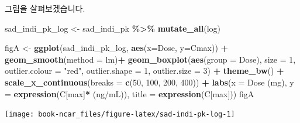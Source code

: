 \documentclass[
  10pt,
]{krantz}
\makeatletter
\newenvironment{Shaded}{\begin{snugshade}}{\end{snugshade}}
\newcommand{\DataTypeTok}[1]{\textcolor[rgb]{0.13,0.29,0.53}{#1}}
\newcommand{\DecValTok}[1]{\textcolor[rgb]{0.00,0.00,0.81}{#1}}
\newcommand{\KeywordTok}[1]{\textcolor[rgb]{0.13,0.29,0.53}{\textbf{#1}}}
\newcommand{\NormalTok}[1]{#1}
\newcommand{\OperatorTok}[1]{\textcolor[rgb]{0.81,0.36,0.00}{\textbf{#1}}}
\newcommand{\StringTok}[1]{\textcolor[rgb]{0.31,0.60,0.02}{#1}}
\newenvironment{kframe}{%
\medskip{}
\setlength{\fboxsep}{.8em}
 \def\at@end@of@kframe{}%
 \ifinner\ifhmode%
  \def\at@end@of@kframe{\end{minipage}}%
  \begin{minipage}{\columnwidth}%
 \fi\fi%
 \def\FrameCommand##1{\hskip\@totalleftmargin \hskip-\fboxsep
 \colorbox{shadecolor}{##1}\hskip-\fboxsep
     \hskip-\linewidth \hskip-\@totalleftmargin \hskip\columnwidth}%
 \MakeFramed {\advance\hsize-\width
   \@totalleftmargin\z@ \linewidth\hsize
   \@setminipage}}%
 {\par\unskip\endMakeFramed%
 \at@end@of@kframe}
\renewenvironment{Shaded}{\begin{kframe}}{\end{kframe}}
\makeatother
\begin{document}
그림을 살펴보겠습니다.

\begin{Shaded}
\begin{Highlighting}[]
\NormalTok{sad\_indi\_pk\_log \textless{}{-}}\StringTok{ }\NormalTok{sad\_indi\_pk }\OperatorTok{\%\textgreater{}\%}\StringTok{ }\KeywordTok{mutate\_all}\NormalTok{(log)}

\NormalTok{figA \textless{}{-}}\StringTok{ }\KeywordTok{ggplot}\NormalTok{(sad\_indi\_pk\_log, }\KeywordTok{aes}\NormalTok{(}\DataTypeTok{x=}\NormalTok{Dose, }\DataTypeTok{y=}\NormalTok{Cmax)) }\OperatorTok{+}
\StringTok{  }\KeywordTok{geom\_smooth}\NormalTok{(}\DataTypeTok{method =} \StringTok{\textquotesingle{}lm\textquotesingle{}}\NormalTok{)}\OperatorTok{+}
\StringTok{  }\KeywordTok{geom\_boxplot}\NormalTok{(}\KeywordTok{aes}\NormalTok{(}\DataTypeTok{group =}\NormalTok{ Dose), }
               \DataTypeTok{size =} \DecValTok{1}\NormalTok{, }
               \DataTypeTok{outlier.colour =} \StringTok{"red"}\NormalTok{, }
               \DataTypeTok{outlier.shape =} \DecValTok{1}\NormalTok{, }
               \DataTypeTok{outlier.size =} \DecValTok{3}\NormalTok{) }\OperatorTok{+}
\StringTok{  }\KeywordTok{theme\_bw}\NormalTok{() }\OperatorTok{+}
\StringTok{  }\KeywordTok{scale\_x\_continuous}\NormalTok{(}\DataTypeTok{breaks =} \KeywordTok{c}\NormalTok{(}\DecValTok{50}\NormalTok{, }\DecValTok{100}\NormalTok{, }\DecValTok{200}\NormalTok{, }\DecValTok{400}\NormalTok{)) }\OperatorTok{+}
\StringTok{  }\KeywordTok{labs}\NormalTok{(}\DataTypeTok{x =} \StringTok{\textquotesingle{}Dose (mg)\textquotesingle{}}\NormalTok{, }\DataTypeTok{y =} \KeywordTok{expression}\NormalTok{(}\StringTok{\textquotesingle{}C\textquotesingle{}}\NormalTok{[max]}\OperatorTok{*}\StringTok{\textquotesingle{} (ng/mL)\textquotesingle{}}\NormalTok{),}
       \DataTypeTok{title =} \KeywordTok{expression}\NormalTok{(}\StringTok{\textquotesingle{}C\textquotesingle{}}\NormalTok{[max]))}
\NormalTok{figA}
\end{Highlighting}
\end{Shaded}

\texttt{[image: book-ncar\_files/figure-latex/sad-indi-pk-log-1]}
\end{document}
